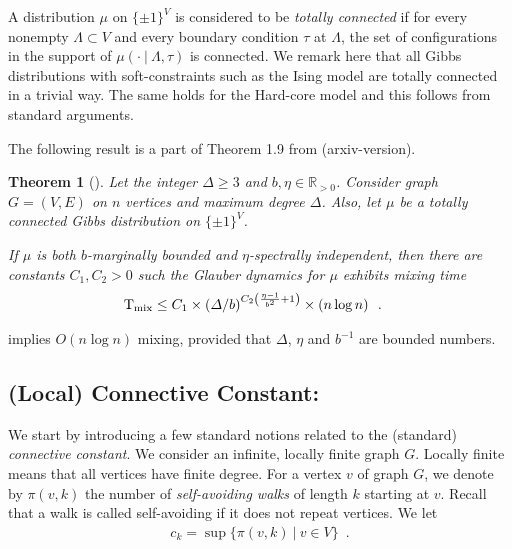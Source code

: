 \documentclass[11pt,reqno]{amsart}
\numberwithin{equation}{section}
\newtheorem{theorem}{Theorem}[section]
\newcommand{\bluepigment}[1]{{\color{blue(pigment)}#1}}
\newcommand{\deeppink}[1]{{\color{deeppink}#1}}
\newcommand{\electricviolet}[1]{{\color{electricviolet}#1}}
\newcommand{\maxDeg}{{\Delta}}
\renewcommand{\bluepigment}[1]{#1}
\renewcommand{\deeppink}[1]{#1}
\renewcommand{\electricviolet}[1]{#1}
\newcommand{\kb}{\deeppink{b}}
\newcommand{\kk}{\bluepigment{k}}
\newcommand{\kv}{\electricviolet{v}}
\renewcommand{\kb}{b}
\renewcommand{\kk}{k}
\renewcommand{\kv}{v}
\begin{document}
 A distribution $\mu$ on $\{\pm 1\}^V$ is considered to be {\em totally
 connected} if for every nonempty $\Lambda \subset V$ and every boundary condition $\tau$ at $\Lambda$,
 the set of configurations in the support of $\mu(\cdot \ |\ \Lambda, \tau)$ is connected. 
%
We remark here that all Gibbs distributions with soft-constraints such as the Ising model are 
totally connected in a trivial way. The same holds for the Hard-core model and this follows from standard arguments. 


The following result is a part of Theorem 1.9 from \cite{VigodaSpectralIndB} (arxiv-version). 

 

\begin{theorem}[\cite{VigodaSpectralIndB}]\label{thrm:SPINLOGN} Let the integer $\maxDeg\geq 3$ and $b,\eta\in \mathbb{R}_{>0}$. 
Consider graph $G=(V,E)$ on $n$ vertices and maximum degree $\maxDeg$. Also, let $\mu$ be a totally connected Gibbs
distribution on $\{\pm 1\}^V$. 

If $\mu$ is both $b$-marginally bounded and $\eta$-spectrally independent, then there are constants $C_1, C_2>0$ such
the Glauber dynamics for $\mu$ exhibits mixing time
\begin{align}\nonumber 
{\rm T}_{\rm mix} &\leq C_1\times \left( {\maxDeg}/{b} \right)^{C_2\left ( \frac{\eta-1}{\kb^2}+1 \right)} \times \left( n \log n \right) \enspace.
\end{align} 
\end{theorem}
  implies  $O(n\log n)$  mixing, provided that $\maxDeg$, $\eta$ and $\kb^{-1}$ are bounded numbers.



\subsection{(Local) Connective Constant:}\label{sec:Intro2LCC}
We start by introducing a few standard notions related to the (standard) {\em connective constant}.
We consider an infinite, locally finite graph $G$. 
Locally finite means that all vertices have finite degree. For a vertex $\kv$ of graph $G$, we denote by $\pi(\kv,\kk)$ the 
number of {\em self-avoiding walks} of length $\kk$ starting at $\kv$. Recall that a walk is called self-avoiding if it does not repeat vertices. 
%
We let 
\begin{align}\nonumber
c_{\kk}=\sup\{ \pi(\kv,\kk)\ |\ \kv\in V\}\enspace. 
\end{align}
\end{document}
